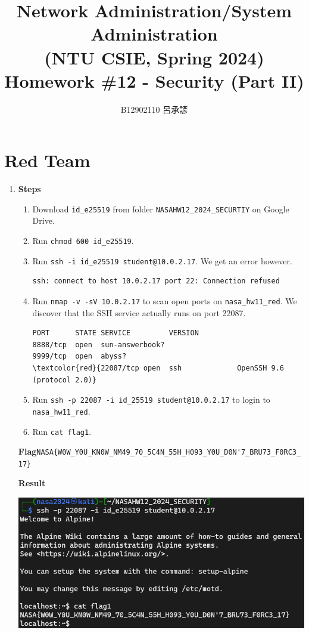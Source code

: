 \documentclass[12pt, a4paper]{article}
\title{
  \vspace{-1cm}
  Network Administration/System Administration\\
  (NTU CSIE, Spring 2024)\\
  Homework \#12 - Security (Part II)
}
\author{\Large B12902110 呂承諺}
\begin{document}
  \maketitle

  \section{Red Team}
  \begin{enumerate}[label=(\alph*)]
    \item \textbf{Steps}
    \begin{enumerate}[label=(\arabic*)]
      \item Download \verb|id_e25519| from folder \verb|NASAHW12_2024_SECURTIY| on Google Drive.
      \item Run \verb|chmod 600 id_e25519|.
      \item Run \verb|ssh -i id_e25519 student@10.0.2.17|. We get an error however.
      \begin{Verbatim}[frame=single]
ssh: connect to host 10.0.2.17 port 22: Connection refused
      \end{Verbatim}
      \item Run \verb|nmap -v -sV 10.0.2.17| to scan open ports on \verb|nasa_hw11_red|. We discover that the SSH service actually runs on
      port 22087.
      \begin{Verbatim}[frame=single, commandchars=\\\{\}]
PORT      STATE SERVICE         VERSION
8888/tcp  open  sun-answerbook?
9999/tcp  open  abyss?
\textcolor{red}{22087/tcp open  ssh             OpenSSH 9.6 (protocol 2.0)}
      \end{Verbatim}
      \item Run \verb|ssh -p 22087 -i id_25519 student@10.0.2.17| to login
      to \verb|nasa_hw11_red|.
      \item Run \verb|cat flag1|.
    \end{enumerate}
    \textbf{Flag}\quad\verb|NASA{W0W_Y0U_KN0W_NM49_70_5C4N_55H_H093_Y0U_D0N'7_BRU73_F0RC3_17}|

    \textbf{Result}

    \includegraphics[width=0.8\linewidth]{1-a_result.png}


\end{enumerate}
\end{document}
